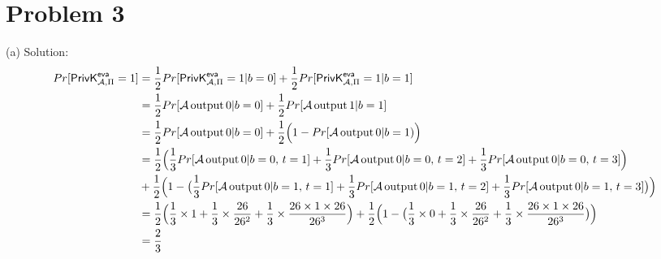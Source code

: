 \documentclass[a4papers]{ctexart}
\begin{document}
\section{Problem 3}
\noindent (a) Solution:
\begin{alignat*}{2}
    Pr[\mathsf{PrivK}^{\mathsf{eva}}_{\mathcal{A},\Pi}=1] 
    &= \dfrac{1}{2}Pr[\mathsf{PrivK}^{\mathsf{eva}}_{\mathcal{A},\Pi}=1 | b=0] + \dfrac{1}{2}Pr[\mathsf{PrivK}^{\mathsf{eva}}_{\mathcal{A},\Pi}=1 | b=1]\\
    &= \dfrac{1}{2}Pr[\mathcal{A}\, {\rm output}\, 0 | b=0 ] + \dfrac{1}{2}Pr[\mathcal{A} \,{\rm output}\, 1 | b=1 ]\\
    &= \dfrac{1}{2}Pr[\mathcal{A}\, {\rm output}\, 0 | b=0 ] +  \dfrac{1}{2}\Big(1-Pr[\mathcal{A}\, {\rm output} \, 0|b=1) \Big)\\
    &= \dfrac{1}{2}\Big(\dfrac{1}{3}Pr[\mathcal{A}\, {\rm output}\, 0 | b=0,\,t=1 ] 
                      + \dfrac{1}{3}Pr[\mathcal{A}\, {\rm output}\, 0 | b=0,\,t=2 ]
                      + \dfrac{1}{3}Pr[\mathcal{A}\, {\rm output}\, 0 | b=0,\,t=3 ]\Big) \\
    &+ \dfrac{1}{2}\Big(1-\big( \dfrac{1}{3}Pr[\mathcal{A}\, {\rm output}\, 0 | b=1,\,t=1 ] 
                      + \dfrac{1}{3}Pr[\mathcal{A}\, {\rm output}\, 0 | b=1,\,t=2 ] 
                      + \dfrac{1}{3}Pr[\mathcal{A}\, {\rm output}\, 0 | b=1,\,t=3 ]\big) \Big)\\
    &= \dfrac{1}{2}\Big(\dfrac{1}{3}\times 1+\dfrac{1}{3}\times\dfrac{26}{26^2}+\dfrac{1}{3}\times\dfrac{26\times 1\times 26}{26^3} \Big)
      + \dfrac{1}{2}\Big(1-\big(\dfrac{1}{3}\times 0+\dfrac{1}{3}\times\dfrac{26}{26^2}+\dfrac{1}{3}\times\dfrac{26\times 1\times 26}{26^3} \big)\Big)\\
    &= \dfrac{2}{3}
\end{alignat*}
\end{document}
